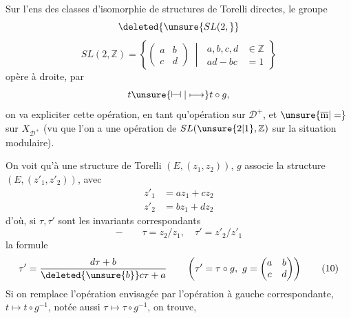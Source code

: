 Sur l'ens des  classes d'isomorphie de structures de Torelli directes, le groupe
\[
\deleted{\unsure{SL(2,}}
\]
\[
SL(2,\mathbb Z)=\left\{\begin{pmatrix}a&b\\c&d\end{pmatrix}\;\middle|\;
\begin{aligned}a,b,c,d&\in\mathbb Z\\ad-bc&=1\end{aligned}\right\} \tag*{(9)}
\]
opère à droite, par
\[
t\unsure{\mathrel{\vdash\!\dashv}|\longmapsto}t\circ g,
\]
on va expliciter cette opération, en tant qu'opération sur $\mathcal D^+$, et $\unsure{\overline{\mathrm m}|=}$ sur $X_{\mathcal D^+}$ (vu que l'on a une opération de $SL(\unsure{2|1},\mathbb Z)$ sur la situation modulaire).

On voit qu'à une structure de Torelli $(E,(z_1,z_2))$, $g$ associe la structure $(E,(z'_1,z'_2))$, avec
\[
\begin{aligned}
z'_1&=az_1+cz_2\\
z'_2&=bz_1+dz_2
\end{aligned}
\]
d'où, si $\tau,\tau'$ sont les invariants correspondants
\[
-\qquad \tau=z_2/z_1,\quad\tau'=z'_2/z'_1
\]
la formule
\[
\tau'=\frac{d\tau+b}{\deleted{\unsure{b}}c\tau+a}\qquad
\left(\tau'=\tau\circ g,\ g=\begin{pmatrix}a&b\\c&d\end{pmatrix}\right) \tag*{(10)}
\]
Si on remplace l'opération envisagée par l'opération à gauche correspondante,  $t\longmapsto t\circ g^{-1}$, notée aussi $\tau\longmapsto\tau\circ g^{-1}$, on trouve,

